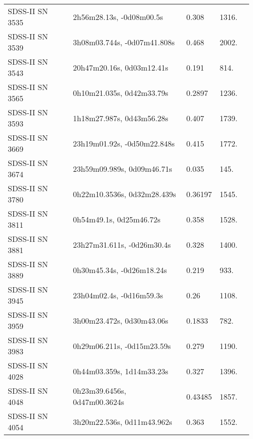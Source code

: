 \begin{longtable}{lllll}
  SDSS-II SN 3535 &       2h56m28.13s, -0d08m00.5s &    0.308 &          1316. &    \citet{2011ApJ...738..162S} \\
  SDSS-II SN 3539 &    3h08m03.744s, -0d07m41.808s &    0.468 &          2002. &    \citet{2011ApJ...738..162S} \\
  SDSS-II SN 3543 &      20h47m20.16s, 0d03m12.41s &    0.191 &           814. &    \citet{2011ApJ...738..162S} \\
  SDSS-II SN 3565 &      0h10m21.035s, 0d42m33.79s &   0.2897 &          1236. &    \citet{2011ApJ...738..162S} \\
  SDSS-II SN 3593 &      1h18m27.987s, 0d43m56.28s &    0.407 &          1739. &    \citet{2011ApJ...738..162S} \\
  SDSS-II SN 3669 &    23h19m01.92s, -0d50m22.848s &    0.415 &          1772. &    \citet{2011ApJ...738..162S} \\
  SDSS-II SN 3674 &     23h59m09.989s, 0d09m46.71s &    0.035 &           145. &    \citet{2011ApJ...738..162S} \\
  SDSS-II SN 3780 &    0h22m10.3536s, 0d32m28.439s &  0.36197 &          1545. &    \citet{2016SDSSD.C...0000:} \\
  SDSS-II SN 3811 &        0h54m49.1s, 0d25m46.72s &    0.358 &          1528. &    \citet{2011ApJ...738..162S} \\
  SDSS-II SN 3881 &     23h27m31.611s, -0d26m30.4s &    0.328 &          1400. &    \citet{2011ApJ...738..162S} \\
  SDSS-II SN 3889 &      0h30m45.34s, -0d26m18.24s &    0.219 &           933. &    \citet{2011ApJ...738..162S} \\
  SDSS-II SN 3945 &       23h04m02.4s, -0d16m59.3s &     0.26 &          1108. &    \citet{2010ApJ...713.1026D} \\
  SDSS-II SN 3959 &      3h00m23.472s, 0d30m43.06s &   0.1833 &           782. &    \citet{2011ApJ...738..162S} \\
  SDSS-II SN 3983 &     0h29m06.211s, -0d15m23.59s &    0.279 &          1190. &    \citet{2011ApJ...738..162S} \\
  SDSS-II SN 4028 &      0h44m03.359s, 1d14m33.23s &    0.327 &          1396. &    \citet{2010ApJ...713.1026D} \\
  SDSS-II SN 4048 &   0h23m39.6456s, 0d47m00.3624s &  0.43485 &          1857. &    \citet{2016SDSSD.C...0000:} \\
  SDSS-II SN 4054 &     3h20m22.536s, 0d11m43.962s &    0.363 &          1552. &    \citet{2011ApJ...738..162S} \\

\end{longtable}
